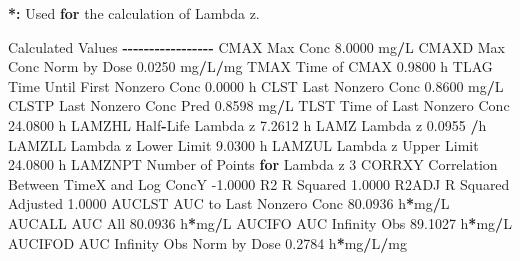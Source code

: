 \documentclass[
  12pt,
]{krantz}
\newenvironment{Shaded}{\begin{snugshade}}{\end{snugshade}}
\newcommand{\ControlFlowTok}[1]{\textcolor[rgb]{0.13,0.29,0.53}{\textbf{#1}}}
\newcommand{\DecValTok}[1]{\textcolor[rgb]{0.00,0.00,0.81}{#1}}
\newcommand{\ErrorTok}[1]{\textcolor[rgb]{0.64,0.00,0.00}{\textbf{#1}}}
\newcommand{\FloatTok}[1]{\textcolor[rgb]{0.00,0.00,0.81}{#1}}
\newcommand{\NormalTok}[1]{#1}
\newcommand{\OperatorTok}[1]{\textcolor[rgb]{0.81,0.36,0.00}{\textbf{#1}}}
\newcommand{\StringTok}[1]{\textcolor[rgb]{0.31,0.60,0.02}{#1}}
\begin{document}
\begin{Shaded}
\begin{Highlighting}[]
\OperatorTok{*}\ErrorTok{:}\StringTok{ }\NormalTok{Used }\ControlFlowTok{for}\NormalTok{ the calculation of Lambda z.}


\NormalTok{Calculated Values}
\OperatorTok{{-}{-}{-}{-}{-}{-}{-}{-}{-}{-}{-}{-}{-}{-}{-}{-}{-}}
\NormalTok{CMAX       Max Conc                                        }\FloatTok{8.0000}\NormalTok{ mg}\OperatorTok{/}\NormalTok{L}
\NormalTok{CMAXD      Max Conc Norm by Dose                           }\FloatTok{0.0250}\NormalTok{ mg}\OperatorTok{/}\NormalTok{L}\OperatorTok{/}\NormalTok{mg}
\NormalTok{TMAX       Time of CMAX                                    }\FloatTok{0.9800}\NormalTok{ h}
\NormalTok{TLAG       Time Until First Nonzero Conc                   }\FloatTok{0.0000}\NormalTok{ h}
\NormalTok{CLST       Last Nonzero Conc                               }\FloatTok{0.8600}\NormalTok{ mg}\OperatorTok{/}\NormalTok{L}
\NormalTok{CLSTP      Last Nonzero Conc Pred                          }\FloatTok{0.8598}\NormalTok{ mg}\OperatorTok{/}\NormalTok{L}
\NormalTok{TLST       Time of Last Nonzero Conc                      }\FloatTok{24.0800}\NormalTok{ h}
\NormalTok{LAMZHL     Half}\OperatorTok{{-}}\NormalTok{Life Lambda z                              }\FloatTok{7.2612}\NormalTok{ h}
\NormalTok{LAMZ       Lambda z                                        }\FloatTok{0.0955} \OperatorTok{/}\NormalTok{h}
\NormalTok{LAMZLL     Lambda z Lower Limit                            }\FloatTok{9.0300}\NormalTok{ h}
\NormalTok{LAMZUL     Lambda z Upper Limit                           }\FloatTok{24.0800}\NormalTok{ h}
\NormalTok{LAMZNPT    Number of Points }\ControlFlowTok{for}\NormalTok{ Lambda z                   }\DecValTok{3}
\NormalTok{CORRXY     Correlation Between TimeX and Log ConcY        }\FloatTok{{-}1.0000} 
\NormalTok{R2         R Squared                                       }\FloatTok{1.0000} 
\NormalTok{R2ADJ      R Squared Adjusted                              }\FloatTok{1.0000} 
\NormalTok{AUCLST     AUC to Last Nonzero Conc                       }\FloatTok{80.0936}\NormalTok{ h}\OperatorTok{*}\NormalTok{mg}\OperatorTok{/}\NormalTok{L}
\NormalTok{AUCALL     AUC All                                        }\FloatTok{80.0936}\NormalTok{ h}\OperatorTok{*}\NormalTok{mg}\OperatorTok{/}\NormalTok{L}
\NormalTok{AUCIFO     AUC Infinity Obs                               }\FloatTok{89.1027}\NormalTok{ h}\OperatorTok{*}\NormalTok{mg}\OperatorTok{/}\NormalTok{L}
\NormalTok{AUCIFOD    AUC Infinity Obs Norm by Dose                   }\FloatTok{0.2784}\NormalTok{ h}\OperatorTok{*}\NormalTok{mg}\OperatorTok{/}\NormalTok{L}\OperatorTok{/}\NormalTok{mg}

\end{Highlighting}
\end{Shaded}
\end{document}
